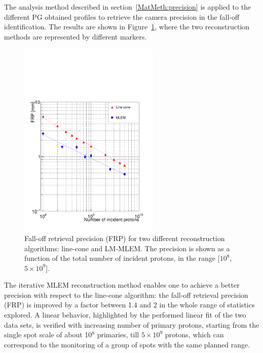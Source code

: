The analysis method described in section~\ref{MatMeth:precision} is applied to the different PG obtained profiles to retrieve the camera precision in the fall-off identification. The results are shown in Figure~\ref{fig:precision}, where the two reconstruction methods are represented by different markers.

\begin{figure}	
\centering
\includegraphics[width=0.6\textwidth]{./Figure/precision_2it.pdf}
\caption{Fall-off retrieval precision (FRP) for two different reconstruction algorithms: line-cone and LM-MLEM. The precision is shown as a function of the total number of incident protons, in the range [$10^{8}$, $5\times10^{9}$].}	
\label{fig:precision}
\end{figure}

The iterative MLEM reconstruction method enables one to achieve a better precision with respect to the line-cone algorithm: the fall-off retrieval precision (FRP) is improved by a factor between 1.4 and 2 in the whole range of statistics explored. A linear behavior, highlighted by the performed linear fit of the two data sets, is verified with increasing number of primary protons, starting from the single spot scale of about 10$^8$ primaries, till $5\times10^9$ protons, which can correspond to the monitoring of a group of spots with the same planned range. 

